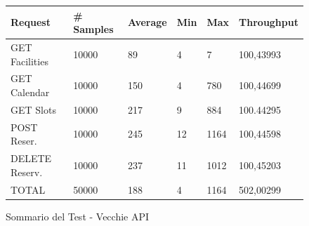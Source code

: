 \begin{figure}[H]
    \begin{table}[H]
        \centering
        \begin{tabular}{ |p{3cm}||p{2cm}|p{2cm}|p{1cm}|p{1cm}|p{2cm}| }
            \hline
            Request & \# Samples & Average  & Min & Max &  Throughput\\
            \hline
            GET Facilities      & 10000    & 89   & 4 & 7 & 100,43993      \\
            GET Calendar        & 10000    & 150   & 4 & 780        & 100,44699      \\
            GET Slots        & 10000    & 217   & 9 & 884        & 100.44295      \\
            POST Reser.        & 10000    & 245    & 12 & 1164        & 100,44598      \\
            DELETE Reserv.        & 10000    & 237    & 11 & 1012        & 100,45203      \\
            TOTAL        & 50000    & 188    & 4 & 1164        & 502,00299      \\
            \hline
        \end{tabular}
    \end{table}
    \caption{Sommario del Test - Vecchie API}
    \label{fig:oldapi100t_summary}
\end{figure}